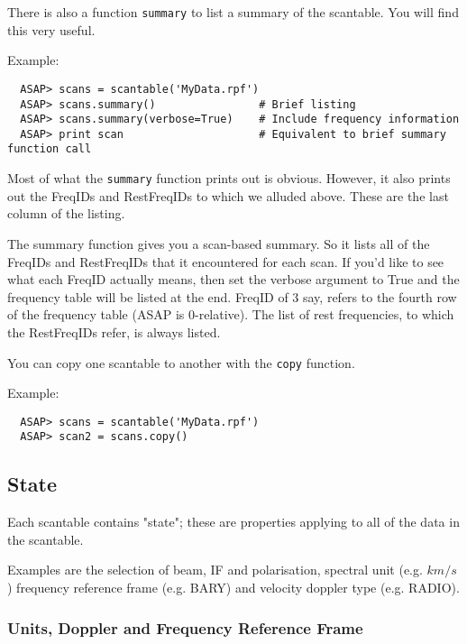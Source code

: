\documentclass[11pt]{article}
\newcommand{\cmd}[1]{{\tt #1}}
\begin{document}
There is also a function \cmd{summary} to list a summary of the scantable.
You will find this very useful.

Example:

\begin{verbatim}
  ASAP> scans = scantable('MyData.rpf')
  ASAP> scans.summary()                # Brief listing
  ASAP> scans.summary(verbose=True)    # Include frequency information
  ASAP> print scan                     # Equivalent to brief summary function call
\end{verbatim}

Most of what the \cmd{summary} function  prints out is obvious. However,
it also prints out the FreqIDs and RestFreqIDs to which we alluded above. 
These are the last column of the listing.

The summary function gives you a scan-based summary.  So it lists all of
the FreqIDs and RestFreqIDs that it encountered for each scan.  If you'd
like to see what each FreqID actually means, then set the verbose
argument to True and the frequency table will be listed at the end. 
FreqID of 3 say, refers to the fourth row of the frequency table (ASAP
is 0-relative). The list of rest frequencies, to which the RestFreqIDs
refer, is always listed.

You can copy one scantable to another with the \cmd{copy} function.

Example:

\begin{verbatim}
  ASAP> scans = scantable('MyData.rpf')
  ASAP> scan2 = scans.copy()
\end{verbatim}



\subsection{State}


Each scantable contains "state"; these are properties  applying to all
of the data in the scantable.  

Examples are the selection of beam, IF and polarisation,  spectral unit
(e.g. $km/s$) frequency reference frame (e.g. BARY) and velocity doppler
type (e.g. RADIO).



\subsubsection{Units, Doppler and Frequency Reference Frame}
\end{document}
